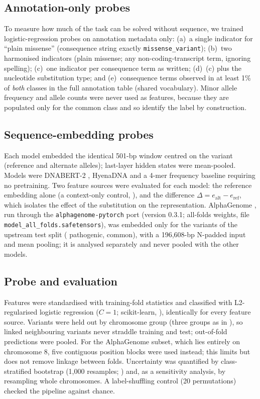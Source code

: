 \documentclass[11pt]{article}
\newcommand{\Dlt}{\Delta}
\begin{document}
\subsection{Annotation-only probes}
To measure how much of the task can be solved without sequence, we trained logistic-regression probes on annotation metadata only: (a)~a single indicator for ``plain missense'' (consequence string exactly \texttt{missense\_variant}); (b)~two harmonised indicators (plain missense; any non-coding-transcript term, ignoring spelling); (c)~one indicator per consequence term as written; (d)~(c) plus the nucleotide substitution type; and (e)~consequence terms observed in at least 1\% of \emph{both} classes in the full annotation table (shared vocabulary). Minor allele frequency and allele counts were never used as features, because they are populated only for the common class and so identify the label by construction.

\subsection{Sequence-embedding probes}
Each model embedded the identical 501-bp window centred on the variant (reference and alternate alleles); last-layer hidden states were mean-pooled. Models were DNABERT-2 \citep{zhou2024dnabert2}, HyenaDNA \citep{nguyen2023hyenadna} and a 4-mer frequency baseline requiring no pretraining. Two feature sources were evaluated for each model: the reference embedding alone (a context-only control, \citealp{hewitt2019control}), and the difference $\Dlt=e_{\mathrm{alt}}-e_{\mathrm{ref}}$, which isolates the effect of the substitution on the representation. AlphaGenome \citep{avsec2026alphagenome}, run through the \texttt{alphagenome-pytorch} port \citep{bredikhin2026alphagenomepytorch} (version 0.3.1; all-folds weights, file \texttt{model\_all\_folds.safetensors}), was embedded only for the \AgN{} variants of the upstream test split (\AgPath{} pathogenic, \AgCommon{} common), with a 196,608-bp N-padded input and mean pooling; it is analysed separately and never pooled with the other models.

\subsection{Probe and evaluation}
Features were standardised with training-fold statistics and classified with L2-regularised logistic regression ($C=1$; scikit-learn, \citealp{pedregosa2011sklearn}), identically for every feature source. Variants were held out by chromosome group (three groups as in \citealp{feng2025benchmark}), so linked neighbouring variants never straddle training and test; out-of-fold predictions were pooled. For the AlphaGenome subset, which lies entirely on chromosome 8, five contiguous position blocks were used instead; this limits but does not remove linkage between folds. Uncertainty was quantified by class-stratified bootstrap (1,000 resamples; \citealp{efron1993bootstrap}) and, as a sensitivity analysis, by resampling whole chromosomes. A label-shuffling control (20 permutations) checked the pipeline against chance.
\end{document}
